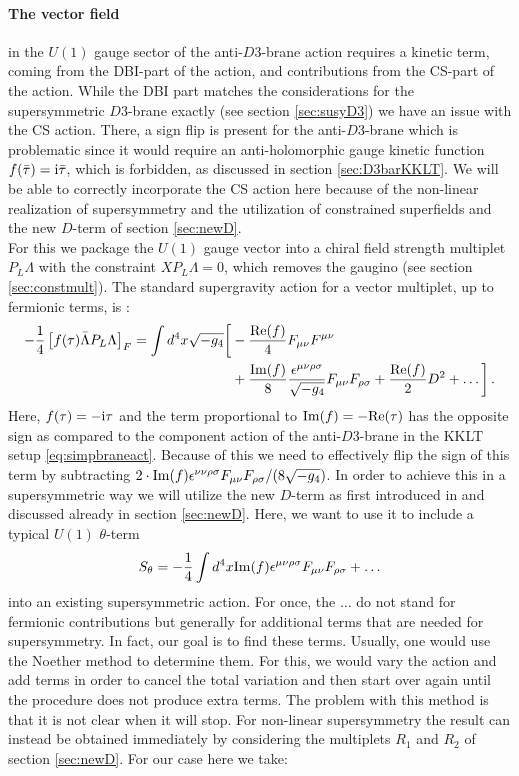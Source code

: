 \documentclass[a4paper,12pt,twoside,openright]{report}
\newcommand{\be}{\begin{equation}}
\newcommand{\ee}{\end{equation}}
\newcommand{\bea}{\begin{equation}\begin{aligned}}
\newcommand{\eea}{\end{aligned}\end{equation}}
\def\rmi{{\rm i}}
\def\rmre{{\rm Re}}
\def\rmim{{\rm Im}}
\begin{document}
\paragraph{The vector field} in the $U(1)$ gauge sector of the anti-$D3$-brane action requires a kinetic term, coming from the DBI-part of the action, and contributions from the CS-part of the action. While the DBI part matches the considerations for the supersymmetric $D3$-brane exactly (see section \ref{sec:susyD3}) we have an issue with the CS action. There, a sign flip is present for the anti-$D3$-brane which is problematic since it would require an anti-holomorphic gauge kinetic function $f(\bar{\tau}) = \rmi \bar{\tau}$, which is forbidden, as discussed in section \ref{sec:D3barKKLT}. We will be able to correctly incorporate the CS action here because of the non-linear realization of supersymmetry and the utilization of constrained superfields and the new $D$-term of section \ref{sec:newD}.\\
For this we package the $U(1)$ gauge vector into a chiral field strength multiplet $P_L\Lambda$ with the constraint $X P_L\Lambda = 0$, which removes the gaugino (see section \ref{sec:constmult}). The standard supergravity action for a vector multiplet, up to fermionic terms, is \cite{Freedman:2012zz}:
\bea
-\frac{1}{4} \left[f(\tau)\bar{\Lambda}P_L\Lambda\right]_F = \int d^4x \sqrt{-g_4}\bigg[&-\frac{\rmre(f)}{4} F_{\mu\nu}F^{\mu\nu}\\
&+\frac{\rmim(f)}{8}\frac{\epsilon^{\mu\nu\rho\sigma}}{\sqrt{-g_4}}F_{\mu\nu}F_{\rho\sigma}+\frac{\rmre(f)}{2}D^2 + \dots \bigg]\,.
\eea
Here, $f(\tau) = -\rmi \tau$ and the term proportional to $\rmim(f)=-\rmre(\tau)$ has the opposite sign as compared to the component action of the anti-$D3$-brane in the KKLT setup \eqref{eq:simpbraneact}. Because of this we need to effectively flip the sign of this term by subtracting $2 \cdot \rmim(f) \epsilon^{\nu\nu\rho\sigma}F_{\mu\nu}F_{\rho\sigma}/(8 \sqrt{-g_4})$. In order to achieve this in a supersymmetric way we will utilize the new $D$-term as first introduced in \cite{Cribiori:2017laj} and discussed already in section \ref{sec:newD}. Here, we want to use it to include a typical $U(1)$ $\theta$-term
\be 
S_{\theta} = -\frac{1}{4} \int d^4x \rmim(f)\epsilon^{\mu\nu\rho\sigma}F_{\mu\nu}F_{\rho\sigma} + \ldots
\label{eq:Stheta}
\ee
into an existing supersymmetric action. For once, the $\ldots$ do not stand for fermionic contributions but generally for additional terms that are needed for supersymmetry. In fact, our goal is to find these terms. Usually, one would use the Noether method to determine them. For this, we would vary the action and add terms in order to cancel the total variation and then start over again until the procedure does not produce extra terms. The problem with this method is that it is not clear when it will stop. For non-linear supersymmetry the result can instead be obtained immediately by considering the multiplets $R_1$ and $R_2$ of section \ref{sec:newD}. For our case here we take:
\end{document}
